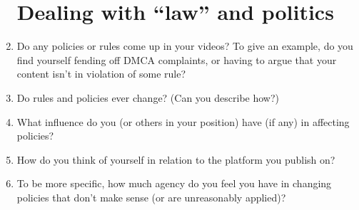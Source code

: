 \documentclass[11pt]{article}
\begin{document}
\begin{enumerate}
  \section*{Dealing with ``law'' and politics}
            \label{sec:DealingWithLaw}
    \item Do any policies or rules come up in your videos?
          To give an example, do you find yourself fending off DMCA complaints,
          or having to argue that your content isn't in violation of some rule?
    \item Do rules and policies ever change?
          (Can you describe how?)
    \item What influence do you (or others in your position) have
          (if any)
          in affecting policies?
    \item How do you think of yourself
          in relation to the platform you publish on?
    \item To be more specific,
          how much agency do you feel you have in
          changing policies that don't make sense
          (or are unreasonably applied)?
\end{enumerate}

\end{document}
